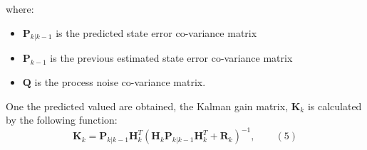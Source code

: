 where:
\begin{itemize}
    \item $\textbf{P}_{k|k-1}$ is the predicted state error co-variance matrix
    \item $\textbf{P}_{k-1}$ is the previous estimated state error co-variance matrix
    \item $\textbf{Q}$ is the process noise co-variance matrix.
\end{itemize}
One the predicted valued are obtained, the Kalman gain matrix, $\textbf{K}_k$ is calculated by the following function:
\begin{displaymath}
              \textbf{K}_k = \textbf{P}_{k|k-1} \textbf{H}^T_k(\textbf{H}_k\textbf{P}_{k|k-1} \textbf{H}^T_k + \textbf{R}_k)^{-1}, \qquad (5)    
\end{displaymath}


